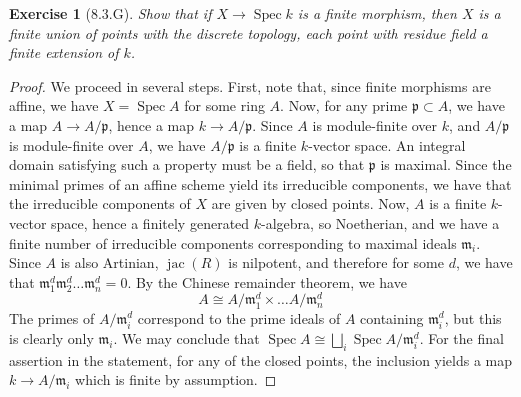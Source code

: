 \documentclass{amsart}
\newtheorem*{exercise*}{Exercise}
\begin{document}
\vspace{0.1in}


\begin{exercise*}[8.3.G]
    Show that if $X \to \operatorname{Spec} k$ is a finite morphism, then $X$ is a finite union of points with the discrete topology, each point with residue field a finite extension
    of $k$.
\end{exercise*}

\begin{proof}
    We proceed in several steps. First, note that, since finite morphisms are affine, we have $X = \operatorname{Spec} A$ for some ring $A$. Now, for any prime $\mathfrak{p} \subset A$,
    we have a map $A \to A/\mathfrak{p}$, hence a map $k \to A/\mathfrak{p}$. Since $A$ is module-finite over $k$, and $A/\mathfrak{p}$ is module-finite over $A$, we have
    $A/\mathfrak{p}$ is a finite $k$-vector space. An integral domain satisfying such a property must be a field, so that $\mathfrak{p}$ is maximal. Since the minimal primes of an affine
    scheme yield its irreducible components, we have that the irreducible components of $X$ are given by closed points. Now, $A$ is a finite $k$-vector space, hence a finitely
    generated $k$-algebra, so Noetherian, and we have a finite number of irreducible components corresponding to maximal ideals $\mathfrak{m}_i$. 
    Since $A$ is also Artinian, $\operatorname{jac}(R)$ is nilpotent, and therefore
    for some $d$, we have that $\mathfrak{m}_1^d\mathfrak{m}_2^d\dots \mathfrak{m}_n^d = 0$. By the Chinese remainder theorem, we have
    \[ A \cong A/\mathfrak{m}_1^d \times \dots A/\mathfrak{m}_n^d\]
    The primes of $A/\mathfrak{m}_i^d$ correspond to the prime ideals of $A$ containing $\mathfrak{m}_i^d$, but this is clearly only $\mathfrak{m}_i$. We may conclude
    that $\operatorname{Spec} A \cong \bigsqcup_i \operatorname{Spec} A/\mathfrak{m}_i^d$. For the final assertion in the statement, for any of the closed points, the inclusion yields
    a map $k \to A/\mathfrak{m}_i$ which is finite by assumption.
\end{proof}

\vspace{0.1in}
\end{document}
